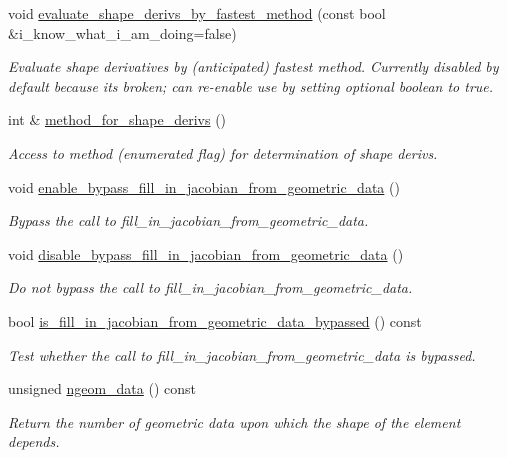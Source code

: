 \begin{DoxyCompactItemize}
void \hyperlink{classoomph_1_1ElementWithMovingNodes_ae49a756cbadda1b02c1599db34f9e019}{evaluate\+\_\+shape\+\_\+derivs\+\_\+by\+\_\+fastest\+\_\+method} (const bool \&i\+\_\+know\+\_\+what\+\_\+i\+\_\+am\+\_\+doing=false)
\begin{DoxyCompactList}\small\item\em Evaluate shape derivatives by (anticipated) fastest method. Currently disabled by default because it\textquotesingle{}s broken; can re-\/enable use by setting optional boolean to true. \end{DoxyCompactList}\item 
int \& \hyperlink{classoomph_1_1ElementWithMovingNodes_a600d39b3c167989dd8eed5869726d35b}{method\+\_\+for\+\_\+shape\+\_\+derivs} ()
\begin{DoxyCompactList}\small\item\em Access to method (enumerated flag) for determination of shape derivs. \end{DoxyCompactList}\item 
void \hyperlink{classoomph_1_1ElementWithMovingNodes_a580ecb70417536ceb1121afd3bea0d54}{enable\+\_\+bypass\+\_\+fill\+\_\+in\+\_\+jacobian\+\_\+from\+\_\+geometric\+\_\+data} ()
\begin{DoxyCompactList}\small\item\em Bypass the call to fill\+\_\+in\+\_\+jacobian\+\_\+from\+\_\+geometric\+\_\+data. \end{DoxyCompactList}\item 
void \hyperlink{classoomph_1_1ElementWithMovingNodes_a4f1d999320dd5bbece88b33241816e9e}{disable\+\_\+bypass\+\_\+fill\+\_\+in\+\_\+jacobian\+\_\+from\+\_\+geometric\+\_\+data} ()
\begin{DoxyCompactList}\small\item\em Do not bypass the call to fill\+\_\+in\+\_\+jacobian\+\_\+from\+\_\+geometric\+\_\+data. \end{DoxyCompactList}\item 
bool \hyperlink{classoomph_1_1ElementWithMovingNodes_a9e6450d4fff45393640ab3043d17ac96}{is\+\_\+fill\+\_\+in\+\_\+jacobian\+\_\+from\+\_\+geometric\+\_\+data\+\_\+bypassed} () const
\begin{DoxyCompactList}\small\item\em Test whether the call to fill\+\_\+in\+\_\+jacobian\+\_\+from\+\_\+geometric\+\_\+data is bypassed. \end{DoxyCompactList}\item 
unsigned \hyperlink{classoomph_1_1ElementWithMovingNodes_acd9274afc02b66bb15b368e359c40a6f}{ngeom\+\_\+data} () const
\begin{DoxyCompactList}\small\item\em Return the number of geometric data upon which the shape of the element depends. \end{DoxyCompactList}\end{DoxyCompactItemize}
